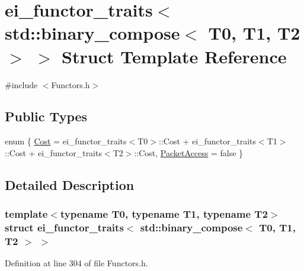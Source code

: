 \hypertarget{structei__functor__traits_3_01std_1_1binary__compose_3_01_t0_00_01_t1_00_01_t2_01_4_01_4}{\section{ei\-\_\-functor\-\_\-traits$<$ std\-:\-:binary\-\_\-compose$<$ T0, T1, T2 $>$ $>$ Struct Template Reference}
\label{structei__functor__traits_3_01std_1_1binary__compose_3_01_t0_00_01_t1_00_01_t2_01_4_01_4}
}


{\ttfamily \#include $<$Functors.\-h$>$}

\subsection*{Public Types}
\begin{DoxyCompactItemize}
\item 
enum \{ \hyperlink{structei__functor__traits_3_01std_1_1binary__compose_3_01_t0_00_01_t1_00_01_t2_01_4_01_4_afe2bd00207979947078cf62b06028997aab94b1f091c08c14d9516d280daa2cf7}{Cost} = ei\-\_\-functor\-\_\-traits$<$T0$>$\-:\-:Cost + ei\-\_\-functor\-\_\-traits$<$T1$>$\-:\-:Cost + ei\-\_\-functor\-\_\-traits$<$T2$>$\-:\-:Cost, 
\hyperlink{structei__functor__traits_3_01std_1_1binary__compose_3_01_t0_00_01_t1_00_01_t2_01_4_01_4_afe2bd00207979947078cf62b06028997a18c8c66282f21ef15cd9fd6f8e877aa5}{Packet\-Access} = false
 \}
\end{DoxyCompactItemize}


\subsection{Detailed Description}
\subsubsection*{template$<$typename T0, typename T1, typename T2$>$struct ei\-\_\-functor\-\_\-traits$<$ std\-::binary\-\_\-compose$<$ T0, T1, T2 $>$ $>$}



Definition at line 304 of file Functors.\-h.



